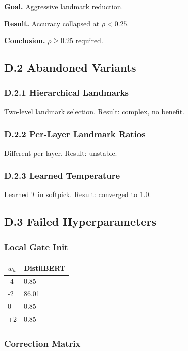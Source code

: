\textbf{Goal.} Aggressive landmark reduction.

\textbf{Result.} Accuracy collapsed at $\rho < 0.25$.

\textbf{Conclusion.} $\rho \geq 0.25$ required.

\subsection{D.2 Abandoned Variants}

\subsubsection{D.2.1 Hierarchical Landmarks}

Two-level landmark selection. Result: complex, no benefit.

\subsubsection{D.2.2 Per-Layer Landmark Ratios}

Different   per layer. Result: unstable.

\subsubsection{D.2.3 Learned Temperature}

Learned $T$ in softpick. Result: converged to 1.0.

\subsection{D.3 Failed Hyperparameters}

\subsubsection{Local Gate Init}

\begin{table}[H]
\centering
\small
\begin{tabular}{ll}
\toprule
\textbf{$w_h$} & \textbf{DistilBERT} \\
\midrule
-4 & 0.85 \\
-2 & 86.01 \\
0 & 0.85 \\
+2 & 0.85 \\
\bottomrule
\end{tabular}
\end{table}

\subsubsection{Correction Matrix}

